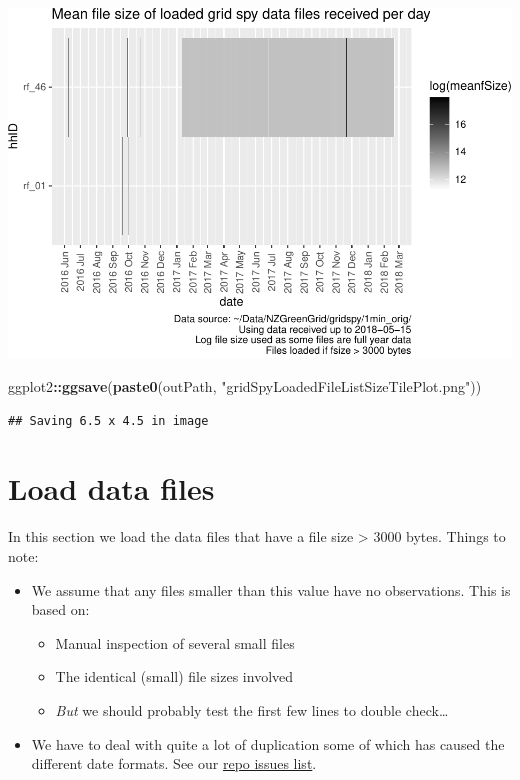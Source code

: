 \documentclass[]{article}
\newenvironment{Shaded}{\begin{snugshade}}{\end{snugshade}}
\newcommand{\KeywordTok}[1]{\textcolor[rgb]{0.13,0.29,0.53}{\textbf{#1}}}
\newcommand{\StringTok}[1]{\textcolor[rgb]{0.31,0.60,0.02}{#1}}
\newcommand{\OperatorTok}[1]{\textcolor[rgb]{0.81,0.36,0.00}{\textbf{#1}}}
\newcommand{\NormalTok}[1]{#1}
\providecommand{\tightlist}{%
  \setlength{\itemsep}{0pt}\setlength{\parskip}{0pt}}
\begin{document}
\includegraphics{processNZGGElecCons1minData_v2_files/figure-latex/loadedFileSizesPlot-1.pdf}

\begin{Shaded}
\begin{Highlighting}[]
\NormalTok{ggplot2}\OperatorTok{::}\KeywordTok{ggsave}\NormalTok{(}\KeywordTok{paste0}\NormalTok{(outPath, }\StringTok{"gridSpyLoadedFileListSizeTilePlot.png"}\NormalTok{))}
\end{Highlighting}
\end{Shaded}

\begin{verbatim}
## Saving 6.5 x 4.5 in image
\end{verbatim}

\section{Load data files}\label{load-data-files}

In this section we load the data files that have a file size
\textgreater{} 3000 bytes. Things to note:

\begin{itemize}
\tightlist
\item
  We assume that any files smaller than this value have no observations.
  This is based on:

  \begin{itemize}
  \tightlist
  \item
    Manual inspection of several small files
  \item
    The identical (small) file sizes involved
  \item
    \emph{But} we should probably test the first few lines to double
    check\ldots{}
  \end{itemize}
\item
  We have to deal with quite a lot of duplication some of which has
  caused the different date formats. See our
  \href{https://git.soton.ac.uk/ba1e12/nzGREENGrid/issues?scope=all\&utf8=\%E2\%9C\%93\&state=all}{repo
  issues list}.
\end{itemize}
\end{document}
